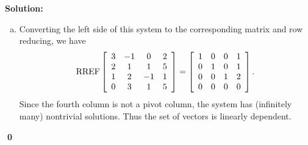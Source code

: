 \documentclass{article}
\newenvironment{solution}
{
  \ignorespaces
  \textbf{Solution:}
}
{
  \ignorespacesafterend
  \begin{flushright}
  {\bfseries \qed}
  \end{flushright}
}
\begin{document}
\begin{solution}
\begin{enumerate}[(a)]
\item Converting the left side of this system to the corresponding matrix and row reducing, we have
\[\operatorname{RREF} \left[\begin{array}{cccc} 3 & -1 & 0 & 2  \\ 2 & 1 & 1 & 5  \\ 1 & 2 & -1 & 1  \\ 0 & 3 & 1 & 5 \end{array}\right] =
\left[\begin{array}{cccc} 1 & 0 & 0 & 1  \\ 0 & 1 & 0 & 1  \\ 0 & 0 & 1 & 2  \\ 0 & 0 & 0 & 0  \end{array}\right].\] 
Since the fourth column is not a pivot column, the system has (infinitely many) nontrivial solutions.
Thus the set of vectors is linearly dependent.
\end{enumerate}
\end{solution}
\end{document}
